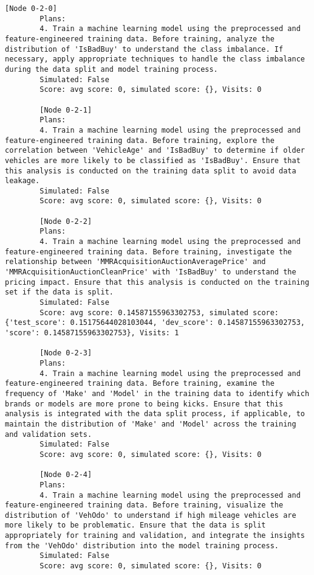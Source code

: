 \begin{lstlisting}[style=txtfile]
		[Node 0-2-0]
		Plans: 
		4. Train a machine learning model using the preprocessed and feature-engineered training data. Before training, analyze the distribution of 'IsBadBuy' to understand the class imbalance. If necessary, apply appropriate techniques to handle the class imbalance during the data split and model training process.
		Simulated: False
		Score: avg score: 0, simulated score: {}, Visits: 0

		[Node 0-2-1]
		Plans: 
		4. Train a machine learning model using the preprocessed and feature-engineered training data. Before training, explore the correlation between 'VehicleAge' and 'IsBadBuy' to determine if older vehicles are more likely to be classified as 'IsBadBuy'. Ensure that this analysis is conducted on the training data split to avoid data leakage.
		Simulated: False
		Score: avg score: 0, simulated score: {}, Visits: 0

		[Node 0-2-2]
		Plans: 
		4. Train a machine learning model using the preprocessed and feature-engineered training data. Before training, investigate the relationship between 'MMRAcquisitionAuctionAveragePrice' and 'MMRAcquisitionAuctionCleanPrice' with 'IsBadBuy' to understand the pricing impact. Ensure that this analysis is conducted on the training set if the data is split.
		Simulated: False
		Score: avg score: 0.14587155963302753, simulated score: {'test_score': 0.15175644028103044, 'dev_score': 0.14587155963302753, 'score': 0.14587155963302753}, Visits: 1

		[Node 0-2-3]
		Plans: 
		4. Train a machine learning model using the preprocessed and feature-engineered training data. Before training, examine the frequency of 'Make' and 'Model' in the training data to identify which brands or models are more prone to being kicks. Ensure that this analysis is integrated with the data split process, if applicable, to maintain the distribution of 'Make' and 'Model' across the training and validation sets.
		Simulated: False
		Score: avg score: 0, simulated score: {}, Visits: 0

		[Node 0-2-4]
		Plans: 
		4. Train a machine learning model using the preprocessed and feature-engineered training data. Before training, visualize the distribution of 'VehOdo' to understand if high mileage vehicles are more likely to be problematic. Ensure that the data is split appropriately for training and validation, and integrate the insights from the 'VehOdo' distribution into the model training process.
		Simulated: False
		Score: avg score: 0, simulated score: {}, Visits: 0


\end{lstlisting}

